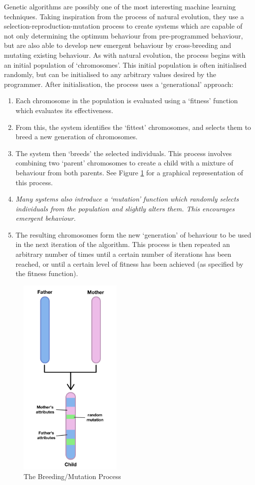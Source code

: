 \documentclass[a4paper,oneside]{report}
\begin{document}
Genetic algorithms are possibly one of the most interesting machine learning techniques. Taking inspiration from the process of natural evolution, they use a selection-reproduction-mutation process to create systems which are capable of not only determining the optimum behaviour from pre-programmed behaviour, but are also able to develop new emergent behaviour by cross-breeding and mutating existing behaviour. As with natural evolution, the process begins with an initial population of `chromosomes'. This initial population is often initialised randomly, but can be initialised to any arbitrary values desired by the programmer. After initialisation, the process uses a `generational' approach:

\begin{enumerate}
	\item Each chromosome in the population is evaluated using a `fitness' function which evaluates its effectiveness.
	\item From this, the system identifies the `fittest' chromosomes, and selects them to breed a new generation of chromosomes.
	\item The system then `breeds' the selected individuals. This process involves combining two `parent' chromosomes to create a child with a mixture of behaviour from both parents. See Figure \ref{fig:Breeding} for a graphical representation of this process.
	\item \emph{Many systems also introduce a `mutation' function which randomly selects individuals from the population and slightly alters them. This encourages emergent behaviour.}
	\item The resulting chromosomes form the new `generation' of behaviour to be used in the next iteration of the algorithm. This process is then repeated an arbitrary number of times until a certain number of iterations has been reached, or until a certain level of fitness has been achieved (as specified by the fitness function).
\end{enumerate}
  
\begin{figure}
	\centering
		\includegraphics[width=50mm]{sources/images/Evolution}
    	\caption{The Breeding/Mutation Process}
    	\label{fig:Breeding}
\end{figure}
\end{document}
